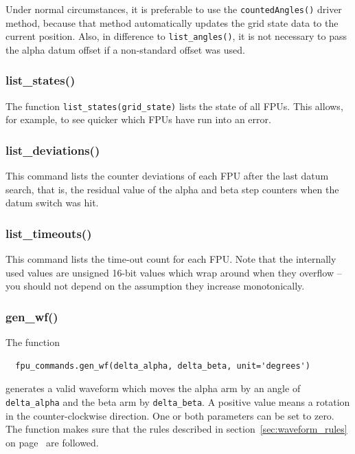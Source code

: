 \documentclass[11pt,a4paper]{report}
\begin{document}
Under normal circumstances, it is preferable to use the
\texttt{countedAngles()} driver method, because that method
automatically updates the grid state data to the current position.
Also, in difference to \texttt{list\_angles()}, it is not necessary
  to pass the alpha datum offset if a non-standard offset was used.

\subsubsection{list\_states()}
\label{sec:liststates}

The function \texttt{list\_states(grid\_state)} lists the state of all
FPUs. This allows, for example, to see quicker which FPUs have run into an error.

\subsubsection{list\_deviations()}
This command lists the counter deviations of each FPU after the last
datum search, that is, the residual value of the alpha and beta step
counters when the datum switch was hit.

\subsubsection{list\_timeouts()}
 This command lists the time-out count for
each FPU. Note that the internally used values are unsigned 16-bit
values which wrap around when they overflow -- you should not depend
on the assumption they increase monotonically.


\subsubsection{gen\_wf()}
\label{sec:genwf}


The function
\begin{verbatim}
  fpu_commands.gen_wf(delta_alpha, delta_beta, unit='degrees')
\end{verbatim}
generates a valid waveform which moves the alpha arm
by an angle of \texttt{delta\_alpha} and the beta arm by
\texttt{delta\_beta}. A positive value means a rotation in the
counter-clockwise direction.  One or both parameters can be set to
zero. The function makes sure that the rules described in
section~\ref{sec:waveform_rules} on page~\pageref{sec:waveform_rules}
are followed.
\end{document}
